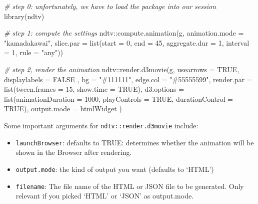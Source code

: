 \documentclass[
]{article}
\newenvironment{Shaded}{\begin{snugshade}}{\end{snugshade}}
\newcommand{\AttributeTok}[1]{\textcolor[rgb]{0.77,0.63,0.00}{#1}}
\newcommand{\CommentTok}[1]{\textcolor[rgb]{0.56,0.35,0.01}{\textit{#1}}}
\newcommand{\ConstantTok}[1]{\textcolor[rgb]{0.00,0.00,0.00}{#1}}
\newcommand{\DecValTok}[1]{\textcolor[rgb]{0.00,0.00,0.81}{#1}}
\newcommand{\FunctionTok}[1]{\textcolor[rgb]{0.00,0.00,0.00}{#1}}
\newcommand{\NormalTok}[1]{#1}
\newcommand{\SpecialCharTok}[1]{\textcolor[rgb]{0.00,0.00,0.00}{#1}}
\newcommand{\StringTok}[1]{\textcolor[rgb]{0.31,0.60,0.02}{#1}}
\begin{document}
\begin{Shaded}
\begin{Highlighting}[]
\CommentTok{\# step 0: unfortunately, we have to load the package into our session}
\FunctionTok{library}\NormalTok{(ndtv)}

\CommentTok{\# step 1: compute the settings}
\NormalTok{ndtv}\SpecialCharTok{::}\FunctionTok{compute.animation}\NormalTok{(g, }\AttributeTok{animation.mode =} \StringTok{"kamadakawai"}\NormalTok{,}
                        \AttributeTok{slice.par =} \FunctionTok{list}\NormalTok{(}\AttributeTok{start =} \DecValTok{0}\NormalTok{, }\AttributeTok{end =} \DecValTok{45}\NormalTok{,}
                                         \AttributeTok{aggregate.dur =} \DecValTok{1}\NormalTok{,}
                                         \AttributeTok{interval =} \DecValTok{1}\NormalTok{, }\AttributeTok{rule =} \StringTok{"any"}\NormalTok{))}

\CommentTok{\# step 2, render the animation}
\NormalTok{ndtv}\SpecialCharTok{::}\FunctionTok{render.d3movie}\NormalTok{(g, }\AttributeTok{usearrows =} \ConstantTok{TRUE}\NormalTok{, }\AttributeTok{displaylabels =} \ConstantTok{FALSE}\NormalTok{ ,}
                     \AttributeTok{bg =} \StringTok{"\#111111"}\NormalTok{,}
                     \AttributeTok{edge.col =} \StringTok{"\#55555599"}\NormalTok{,}
                     \AttributeTok{render.par =} \FunctionTok{list}\NormalTok{(}\AttributeTok{tween.frames =} \DecValTok{15}\NormalTok{,}
                                       \AttributeTok{show.time =} \ConstantTok{TRUE}\NormalTok{),}
                     \AttributeTok{d3.options =} \FunctionTok{list}\NormalTok{(}\AttributeTok{animationDuration =} \DecValTok{1000}\NormalTok{,}
                                       \AttributeTok{playControls =} \ConstantTok{TRUE}\NormalTok{,}
                                       \AttributeTok{durationControl =} \ConstantTok{TRUE}\NormalTok{),}
                     \AttributeTok{output.mode =} \StringTok{\textquotesingle{}htmlWidget\textquotesingle{}}
\NormalTok{                     )}
\end{Highlighting}
\end{Shaded}

Some important arguments for \texttt{ndtv::render.d3movie} include:

\begin{itemize}
\item
  \texttt{launchBrowser}: defaults to TRUE: determines whether the
  animation will be shown in the Browser after rendering.
\item
  \texttt{output.mode}: the kind of output you want (defaults to `HTML')
\item
  \texttt{filename}: The file name of the HTML or JSON file to be
  generated. Only relevant if you picked `HTML' or `JSON' as
  output.mode.
\end{itemize}
\end{document}
